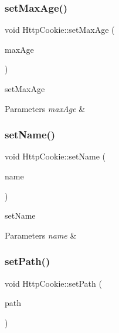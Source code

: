 \subsubsection{\texorpdfstring{set\+Max\+Age()}{setMaxAge()}}
{\footnotesize\ttfamily void Http\+Cookie\+::set\+Max\+Age (\begin{DoxyParamCaption}\item[{int}]{max\+Age }\end{DoxyParamCaption})}



set\+Max\+Age 


\begin{DoxyParams}{Parameters}
{\em max\+Age} & \\
\hline
\end{DoxyParams}
\mbox{\label{class_http_cookie_a18dc03fc2cc3901051f7aec516c964b8}} 
\subsubsection{\texorpdfstring{set\+Name()}{setName()}}
{\footnotesize\ttfamily void Http\+Cookie\+::set\+Name (\begin{DoxyParamCaption}\item[{const Q\+Byte\+Array \&}]{name }\end{DoxyParamCaption})}



set\+Name 


\begin{DoxyParams}{Parameters}
{\em name} & \\
\hline
\end{DoxyParams}
\mbox{\label{class_http_cookie_ae302154143022f4bb213afc569df8dd5}} 
\subsubsection{\texorpdfstring{set\+Path()}{setPath()}}
{\footnotesize\ttfamily void Http\+Cookie\+::set\+Path (\begin{DoxyParamCaption}\item[{const Q\+Byte\+Array \&}]{path }\end{DoxyParamCaption})}



